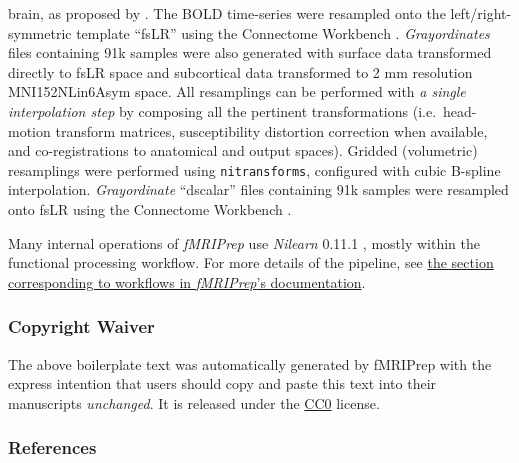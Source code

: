\documentclass[
]{article}
\begin{document}
\begin{description}
brain, as proposed by \citep{patriat_improved_2017}. The BOLD
time-series were resampled onto the left/right-symmetric template
``fsLR'' using the Connectome Workbench \citep{hcppipelines}.
\emph{Grayordinates} files \citep{hcppipelines} containing 91k samples
were also generated with surface data transformed directly to fsLR space
and subcortical data transformed to 2 mm resolution MNI152NLin6Asym
space. All resamplings can be performed with \emph{a single
interpolation step} by composing all the pertinent transformations
(i.e.~head-motion transform matrices, susceptibility distortion
correction when available, and co-registrations to anatomical and output
spaces). Gridded (volumetric) resamplings were performed using
\texttt{nitransforms}, configured with cubic B-spline interpolation.
\emph{Grayordinate} ``dscalar'' files containing 91k samples were
resampled onto fsLR using the Connectome Workbench \citep{hcppipelines}.
\end{description}

Many internal operations of \emph{fMRIPrep} use \emph{Nilearn} 0.11.1
\citep[RRID:SCR\_001362]{nilearn}, mostly within the functional
processing workflow. For more details of the pipeline, see
\href{https://fmriprep.readthedocs.io/en/latest/workflows.html}{the
section corresponding to workflows in \emph{fMRIPrep}'s documentation}.

\subsubsection{Copyright Waiver}\label{copyright-waiver}

The above boilerplate text was automatically generated by fMRIPrep with
the express intention that users should copy and paste this text into
their manuscripts \emph{unchanged}. It is released under the
\href{https://creativecommons.org/publicdomain/zero/1.0/}{CC0} license.

\subsubsection{References}\label{references}


\end{document}
